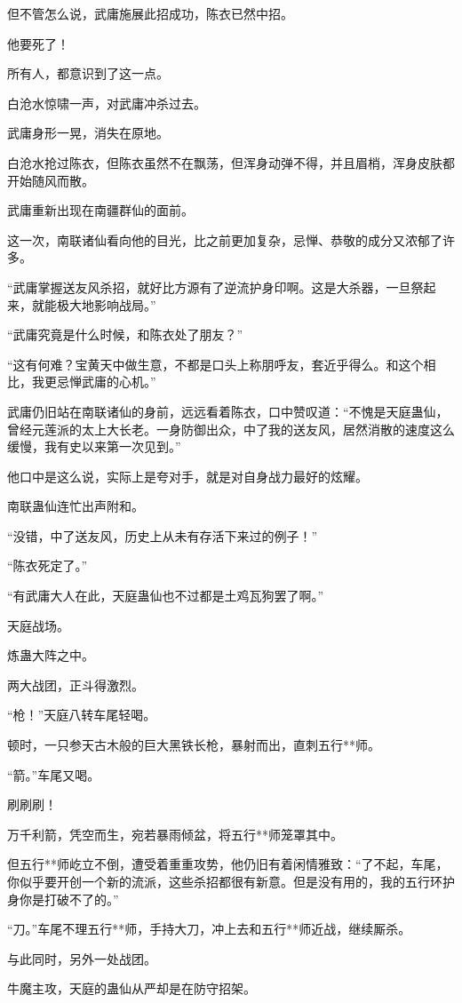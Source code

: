 \begin{this_body}
但不管怎么说，武庸施展此招成功，陈衣已然中招。

他要死了！

所有人，都意识到了这一点。

白沧水惊啸一声，对武庸冲杀过去。

武庸身形一晃，消失在原地。

白沧水抢过陈衣，但陈衣虽然不在飘荡，但浑身动弹不得，并且眉梢，浑身皮肤都开始随风而散。

武庸重新出现在南疆群仙的面前。

这一次，南联诸仙看向他的目光，比之前更加复杂，忌惮、恭敬的成分又浓郁了许多。

“武庸掌握送友风杀招，就好比方源有了逆流护身印啊。这是大杀器，一旦祭起来，就能极大地影响战局。”

“武庸究竟是什么时候，和陈衣处了朋友？”

“这有何难？宝黄天中做生意，不都是口头上称朋呼友，套近乎得么。和这个相比，我更忌惮武庸的心机。”

武庸仍旧站在南联诸仙的身前，远远看着陈衣，口中赞叹道：“不愧是天庭蛊仙，曾经元莲派的太上大长老。一身防御出众，中了我的送友风，居然消散的速度这么缓慢，我有史以来第一次见到。”

他口中是这么说，实际上是夸对手，就是对自身战力最好的炫耀。

南联蛊仙连忙出声附和。

“没错，中了送友风，历史上从未有存活下来过的例子！”

“陈衣死定了。”

“有武庸大人在此，天庭蛊仙也不过都是土鸡瓦狗罢了啊。”

天庭战场。

炼蛊大阵之中。

两大战团，正斗得激烈。

“枪！”天庭八转车尾轻喝。

顿时，一只参天古木般的巨大黑铁长枪，暴射而出，直刺五行**师。

“箭。”车尾又喝。

刷刷刷！

万千利箭，凭空而生，宛若暴雨倾盆，将五行**师笼罩其中。

但五行**师屹立不倒，遭受着重重攻势，他仍旧有着闲情雅致：“了不起，车尾，你似乎要开创一个新的流派，这些杀招都很有新意。但是没有用的，我的五行环护身你是打破不了的。”

“刀。”车尾不理五行**师，手持大刀，冲上去和五行**师近战，继续厮杀。

与此同时，另外一处战团。

牛魔主攻，天庭的蛊仙从严却是在防守招架。


\end{this_body}
